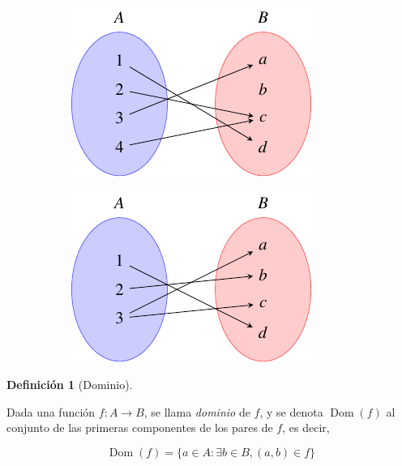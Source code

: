 \documentclass[
  a4paper,
]{scrreport}
\theoremstyle{definition}
\theoremstyle{plain}
\theoremstyle{definition}
\newtheorem{definition}{Definición}[chapter]
\theoremstyle{definition}
\theoremstyle{plain}
\theoremstyle{plain}
\theoremstyle{remark}
\begin{document}
\begin{figure}

\begin{minipage}{0.50\linewidth}

\begin{figure}[H]

{\centering \includegraphics{./img/teoria-conjuntos/funcion-no-inyectiva-no-sobreyectiva.pdf}

}


\end{figure}%

\end{minipage}%
%
\begin{minipage}{0.50\linewidth}

\begin{figure}[H]

{\centering \includegraphics{./img/teoria-conjuntos/no-funcion.pdf}

}


\end{figure}%

\end{minipage}%

\end{figure}%

\begin{definition}[Dominio]\protect\hypertarget{def-dominio-funcion}{}\label{def-dominio-funcion}

Dada una función \(f:A\rightarrow B\), se llama \emph{dominio} de \(f\),
y se denota \(\operatorname{Dom}(f)\) al conjunto de las primeras
componentes de los pares de \(f\), es decir,

\[\operatorname{Dom}(f) = \{a\in A: \exists b\in B, (a,b)\in f\}\]

\end{definition}
\end{document}
